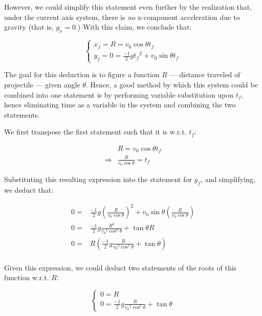 \documentclass[letterpaper]{article}
\begin{document}
However, we could simplify this statement even further by the realization that, under the current axis system, there is \emph{no} x-component acceleration due to gravity (that is, \(g_x = 0\).) With this claim, we conclude that:

\begin{equation}
    \begin{cases}
        x_f = R = v_0\cos\theta t_f \\
        y_f = 0 = \frac{-1}{2}g{t_f}^2 + v_0\sin\theta t_f
    \end{cases}
\end{equation}

The goal for this deduction is to figure a function \(R\) --- distance traveled of projectile --- given angle \(\theta\). Hence, a good method by which this system could be combined into one statement is by performing variable substitution upon \(t_f\), hence eliminating time as a variable in the system and combining the two statements.

We first transpose the first statement such that it is w.r.t. \(t_f\):

\begin{align}
    &R = v_0 \cos\theta t_f \\
\Rightarrow &\frac{R}{v_0 \cos\theta} = t_f
\end{align}

Substituting this resulting expression into the statement for \(y_f\), and simplifying, we deduct that:

\begin{align}
    0 =& \frac{-1}{2}g(\frac{R}{v_0 \cos\theta})^2 + v_0 \sin\theta (\frac{R}{v_0 \cos\theta}) \\
    0 =& \frac{-1}{2}g\frac{R^2}{{v_0}^2 \cos^2\theta} + \tan\theta R \\
    0 =& R (\frac{-1}{2}g\frac{R}{{v_0}^2 \cos^2\theta} + \tan\theta) \\
\end{align}

Given this expression, we could deduct two statements of the roots of this function w.r.t. \(R\):

\begin{equation}
    \begin{cases}
        0 = R \\
        0 = \frac{-1}{2}g\frac{R}{{v_0}^2 \cos^2\theta} + \tan\theta
    \end{cases}
\end{equation}
\end{document}

